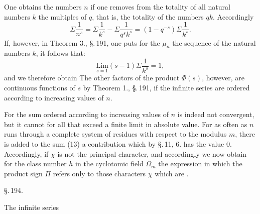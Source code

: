 One obtains the numbers $n$ if one removes from the totality of all natural
numbers $k$ the multiples of $q$, that is, the totality of the numbers $qk$.
Accordingly
\[
\Sigma \frac{1}{n^s} = \Sigma \frac{1}{k^s} - \Sigma \frac{1}{q^s k^s} = (1-q^{-s}) \Sigma \frac{1}{k^s}.
\]
If, however, in Theorem 3., \S.\,191, one puts for the $\mu_n$ the sequence of
the natural numbers $k$, it follows that:
\[
\underset{s=1}{\mathrm{Lim}} (s-1) \Sigma \frac{1}{k^s} = 1,
\]
and we therefore obtain
The other factors of the product $\Phi(s)$, however, are continuous functions of
$s$ by Theorem 1., \S.\,191, if the infinite series are ordered according to
increasing values of $n$.

For the sum
ordered according to increasing values of $n$ is indeed not convergent, but it
cannot for all that exceed a finite limit in absolute value. For as often as $n$
runs through a complete system of residues with respect to the modulus $m$,
there is added to the sum (13) a contribution which by \S.\,11, 6. has the value
0. Accordingly, if $\chi$ is not the principal character,
and accordingly we now obtain for the class number $h$ in the cyclotomic field
$\Omega_m$ the expression
in which the product sign $\Pi$ refers only to those characters $\chi$ which are
.

\begin{center}
\S.\,194.

\end{center}

The infinite series
